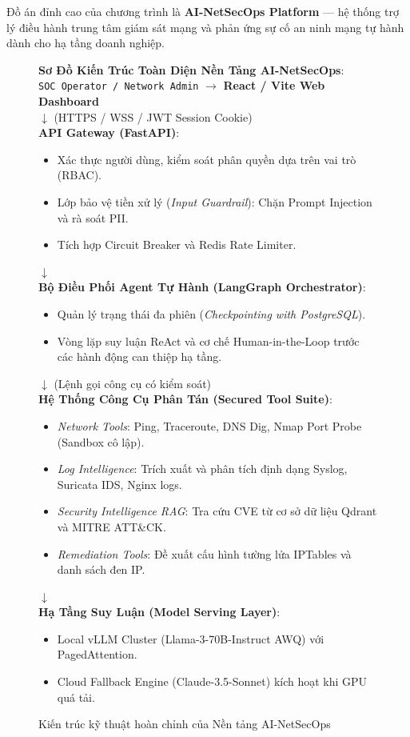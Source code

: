 Đồ án đỉnh cao của chương trình là \textbf{AI-NetSecOps Platform} --- hệ thống trợ lý điều hành trung tâm giám sát mạng và phản ứng sự cố an ninh mạng tự hành dành cho hạ tầng doanh nghiệp.

\begin{figure}[htbp]
\centering
\begin{tcolorbox}[colback=boxbg,colframe=primarycolor,width=0.95\textwidth,arc=2pt]
\small
\textbf{Sơ Đồ Kiến Trúc Toàn Diện Nền Tảng AI-NetSecOps}:\\[0.2cm]
\texttt{SOC Operator / Network Admin} $\longrightarrow$ \textbf{React / Vite Web Dashboard}\\
$\downarrow$ (HTTPS / WSS / JWT Session Cookie)\\
\textbf{API Gateway (FastAPI)}:
\begin{itemize}
  \item Xác thực người dùng, kiểm soát phân quyền dựa trên vai trò (RBAC).
  \item Lớp bảo vệ tiền xử lý (\textit{Input Guardrail}): Chặn Prompt Injection và rà soát PII.
  \item Tích hợp Circuit Breaker và Redis Rate Limiter.
\end{itemize}
$\downarrow$\\
\textbf{Bộ Điều Phối Agent Tự Hành (LangGraph Orchestrator)}:
\begin{itemize}
  \item Quản lý trạng thái đa phiên (\textit{Checkpointing with PostgreSQL}).
  \item Vòng lặp suy luận ReAct và cơ chế Human-in-the-Loop trước các hành động can thiệp hạ tầng.
\end{itemize}
$\downarrow$ (Lệnh gọi công cụ có kiểm soát)\\
\textbf{Hệ Thống Công Cụ Phân Tán (Secured Tool Suite)}:
\begin{itemize}
  \item \textit{Network Tools}: Ping, Traceroute, DNS Dig, Nmap Port Probe (Sandbox cô lập).
  \item \textit{Log Intelligence}: Trích xuất và phân tích định dạng Syslog, Suricata IDS, Nginx logs.
  \item \textit{Security Intelligence RAG}: Tra cứu CVE từ cơ sở dữ liệu Qdrant và MITRE ATT\&CK.
  \item \textit{Remediation Tools}: Đề xuất cấu hình tường lửa IPTables và danh sách đen IP.
\end{itemize}
$\downarrow$\\
\textbf{Hạ Tầng Suy Luận (Model Serving Layer)}:
\begin{itemize}
  \item Local vLLM Cluster (Llama-3-70B-Instruct AWQ) với PagedAttention.
  \item Cloud Fallback Engine (Claude-3.5-Sonnet) kích hoạt khi GPU quá tải.
\end{itemize}
\end{tcolorbox}
\caption{Kiến trúc kỹ thuật hoàn chỉnh của Nền tảng AI-NetSecOps}
\label{fig:capstone-netsecops-arch}
\end{figure}


